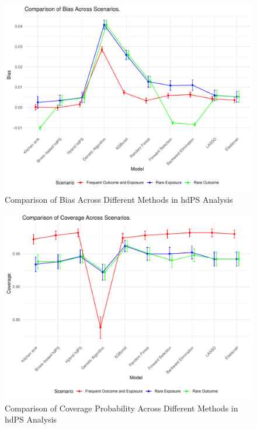 \documentclass[sn-vancouver,Numbered,lineno,pdflatex]{sn-jnl}
\begin{document}
\begin{figure}[th]

{\centering \includegraphics[width=1\linewidth,]{figures/metric_comparison_Bias} 

}

\caption{Comparison of Bias Across Different Methods in hdPS Analysis\label{fig:bias-comparison}}\label{fig:unnamed-chunk-1}
\end{figure}

\begin{figure}[th]

{\centering \includegraphics[width=1\linewidth,]{figures/metric_comparison_Coverage} 

}

\caption{Comparison of Coverage Probability Across Different Methods in hdPS Analysis\label{fig:Coverage-comparison}}\label{fig:unnamed-chunk-2}
\end{figure}
\end{document}
